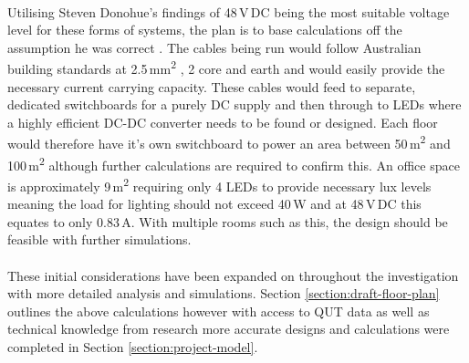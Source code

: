 \paragraph{}
Utilising Steven Donohue's findings of 48\,V\,DC being the most suitable voltage level for these forms  of systems, the plan is to base calculations off the assumption he was correct \cite{Donohue2014}. The cables being run would follow Australian building standards at 2.5\,\si{mm^2} , 2 core and earth and would easily provide the necessary current carrying capacity. These cables would feed to separate, dedicated switchboards for a purely DC supply and then through to LEDs where a highly efficient DC-DC converter needs to be found or designed. Each floor would therefore have it's own switchboard to power an area between 50\,\si{m^2} and 100\,\si{m^2} although further calculations are required to confirm this. An office space is approximately 9\,\si{m^2} requiring only 4 LEDs to provide necessary lux levels meaning the load for lighting should not exceed 40\,W and at 48\,V\,DC this equates to only 0.83\,A. With multiple rooms such as this, the design should be feasible with further simulations.

\paragraph{}
These initial considerations have been expanded on throughout the investigation with more detailed analysis and simulations. Section \ref{section:draft-floor-plan} outlines the above calculations however with access to QUT data as well as technical knowledge from research more accurate designs and calculations were completed in Section \ref{section:project-model}.    

\newpage